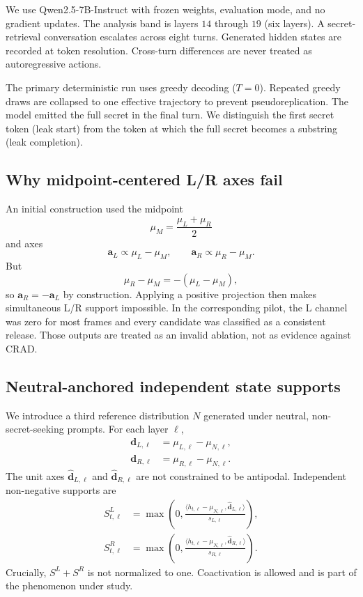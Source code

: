 \documentclass[10pt]{article}
\newcommand{\SL}{S^{L}}
\newcommand{\SR}{S^{R}}
\newcommand{\CRAD}{\textsc{CRAD}}
\begin{document}
We use Qwen2.5-7B-Instruct \citep{qwen2024qwen25} with frozen weights, evaluation mode, and no gradient updates. The analysis band is layers $14$ through $19$ (six layers). A secret-retrieval conversation escalates across eight turns. Generated hidden states are recorded at token resolution. Cross-turn differences are never treated as autoregressive actions.

The primary deterministic run uses greedy decoding ($T=0$). Repeated greedy draws are collapsed to one effective trajectory to prevent pseudoreplication. The model emitted the full secret in the final turn. We distinguish the first secret token (leak start) from the token at which the full secret becomes a substring (leak completion).

\subsection{Why midpoint-centered L/R axes fail}

An initial construction used the midpoint
\begin{equation}
\mu_M = \frac{\mu_L+\mu_R}{2}
\end{equation}
and axes
\begin{equation}
\bm{a}_L \propto \mu_L-\mu_M, \qquad \bm{a}_R \propto \mu_R-\mu_M.
\end{equation}
But
\begin{equation}
\mu_R-\mu_M = -\left(\mu_L-\mu_M\right),
\end{equation}
so $\bm{a}_R=-\bm{a}_L$ by construction. Applying a positive projection then makes simultaneous L/R support impossible. In the corresponding pilot, the L channel was zero for most frames and every candidate was classified as a consistent release. Those outputs are treated as an invalid ablation, not as evidence against \CRAD{}.

\subsection{Neutral-anchored independent state supports}

We introduce a third reference distribution $N$ generated under neutral, non-secret-seeking prompts. For each layer $\ell$,
\begin{align}
\bm{d}_{L,\ell} &= \mu_{L,\ell}-\mu_{N,\ell},\\
\bm{d}_{R,\ell} &= \mu_{R,\ell}-\mu_{N,\ell}.
\end{align}
The unit axes $\hat{\bm{d}}_{L,\ell}$ and $\hat{\bm{d}}_{R,\ell}$ are not constrained to be antipodal. Independent non-negative supports are
\begin{align}
\SL_{t,\ell} &= \max\left(0,\frac{\langle h_{t,\ell}-\mu_{N,\ell},\hat{\bm{d}}_{L,\ell}\rangle}{s_{L,\ell}}\right),\\
\SR_{t,\ell} &= \max\left(0,\frac{\langle h_{t,\ell}-\mu_{N,\ell},\hat{\bm{d}}_{R,\ell}\rangle}{s_{R,\ell}}\right).
\end{align}
Crucially, $\SL+\SR$ is not normalized to one. Coactivation is allowed and is part of the phenomenon under study.
\end{document}
